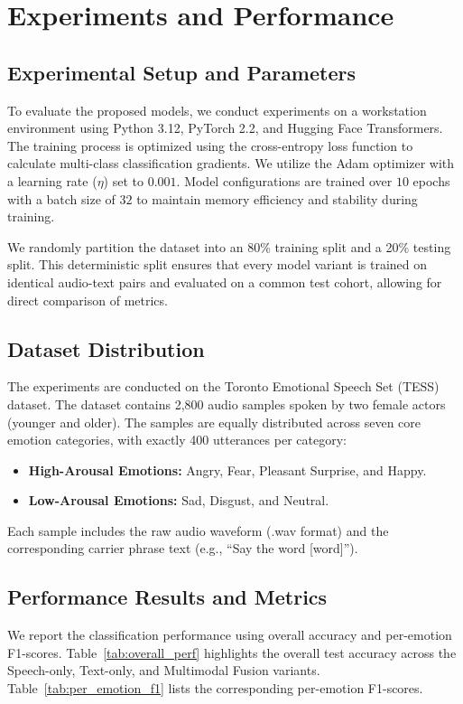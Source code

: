 \documentclass[11pt,journal,onecolumn]{IEEEtran}
\begin{document}
\section{Experiments and Performance}

\subsection{Experimental Setup and Parameters}
To evaluate the proposed models, we conduct experiments on a workstation environment using Python 3.12, PyTorch 2.2, and Hugging Face Transformers. The training process is optimized using the cross-entropy loss function to calculate multi-class classification gradients. We utilize the Adam optimizer with a learning rate ($\eta$) set to $0.001$. Model configurations are trained over $10$ epochs with a batch size of $32$ to maintain memory efficiency and stability during training. 

We randomly partition the dataset into an 80\% training split and a 20\% testing split. This deterministic split ensures that every model variant is trained on identical audio-text pairs and evaluated on a common test cohort, allowing for direct comparison of metrics.

\subsection{Dataset Distribution}
The experiments are conducted on the Toronto Emotional Speech Set (TESS) dataset. The dataset contains 2,800 audio samples spoken by two female actors (younger and older). The samples are equally distributed across seven core emotion categories, with exactly 400 utterances per category:
\begin{itemize}
    \item \textbf{High-Arousal Emotions:} Angry, Fear, Pleasant Surprise, and Happy.
    \item \textbf{Low-Arousal Emotions:} Sad, Disgust, and Neutral.
\end{itemize}
Each sample includes the raw audio waveform (.wav format) and the corresponding carrier phrase text (e.g., ``Say the word [word]'').

\subsection{Performance Results and Metrics}
We report the classification performance using overall accuracy and per-emotion F1-scores. Table~\ref{tab:overall_perf} highlights the overall test accuracy across the Speech-only, Text-only, and Multimodal Fusion variants. Table~\ref{tab:per_emotion_f1} lists the corresponding per-emotion F1-scores.
\end{document}
